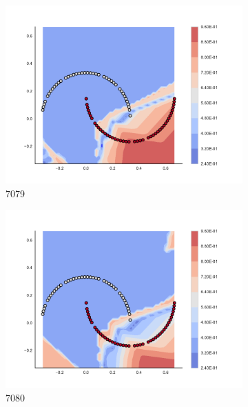 \begin{figure}[h]
\begin{subfigure}[b]{0.09\textwidth}
    \includegraphics[clip, trim=2.35cm 1.75cm 4.5cm 0cm,width=\textwidth]{img/convergence/7079.pdf}
    \caption{7079}
    \label{fig:convergence_7079}
\end{subfigure}
%
\begin{subfigure}[b]{0.09\textwidth}
    \includegraphics[clip, trim=2.35cm 1.75cm 4.5cm 0cm,width=\textwidth]{img/convergence/7080.pdf}
    \caption{7080}
    \label{fig:convergence_7080}
\end{subfigure}
%
\begin{subfigure}[b]{0.09\textwidth}

\end{subfigure}
\end{figure}
